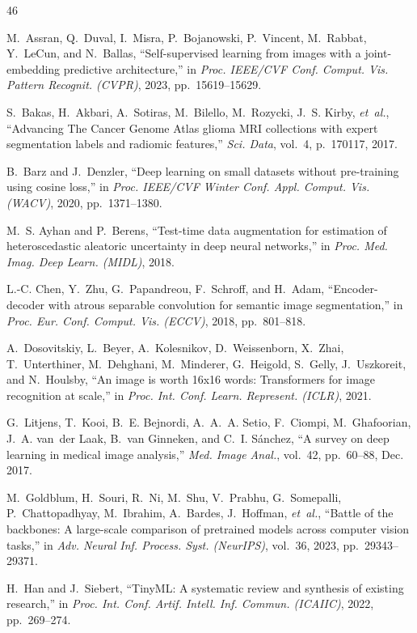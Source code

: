\begin{thebibliography}{46}

M.~Assran, Q.~Duval, I.~Misra, P.~Bojanowski, P.~Vincent, M.~Rabbat, Y.~LeCun, and N.~Ballas, ``Self-supervised learning from images with a joint-embedding predictive architecture,'' in \emph{Proc. IEEE/CVF Conf. Comput. Vis. Pattern Recognit. (CVPR)}, 2023, pp.~15619--15629.

S.~Bakas, H.~Akbari, A.~Sotiras, M.~Bilello, M.~Rozycki, J.~S. Kirby, \emph{et~al.}, ``Advancing The Cancer Genome Atlas glioma MRI collections with expert segmentation labels and radiomic features,'' \emph{Sci. Data}, vol.~4, p.~170117, 2017. 

B.~Barz and J.~Denzler, ``Deep learning on small datasets without pre-training using cosine loss,'' in \emph{Proc. IEEE/CVF Winter Conf. Appl. Comput. Vis. (WACV)}, 2020, pp.~1371--1380.

M.~S. Ayhan and P.~Berens, ``Test-time data augmentation for estimation of heteroscedastic aleatoric uncertainty in deep neural networks,'' in \emph{Proc. Med. Imag. Deep Learn. (MIDL)}, 2018.

L.-C. Chen, Y.~Zhu, G.~Papandreou, F.~Schroff, and H.~Adam, ``Encoder-decoder with atrous separable convolution for semantic image segmentation,'' in \emph{Proc. Eur. Conf. Comput. Vis. (ECCV)}, 2018, pp.~801--818.

A.~Dosovitskiy, L.~Beyer, A.~Kolesnikov, D.~Weissenborn, X.~Zhai, T.~Unterthiner, M.~Dehghani, M.~Minderer, G.~Heigold, S.~Gelly, J.~Uszkoreit, and N.~Houlsby, ``An image is worth 16x16 words: Transformers for image recognition at scale,'' in \emph{Proc. Int. Conf. Learn. Represent. (ICLR)}, 2021.

G.~Litjens, T.~Kooi, B.~E. Bejnordi, A.~A.~A. Setio, F.~Ciompi, M.~Ghafoorian, J.~A. van~der Laak, B.~van Ginneken, and C.~I. S{\'a}nchez, ``A survey on deep learning in medical image analysis,'' \emph{Med. Image Anal.}, vol.~42, pp.~60--88, Dec. 2017. 

M.~Goldblum, H.~Souri, R.~Ni, M.~Shu, V.~Prabhu, G.~Somepalli, P.~Chattopadhyay, M.~Ibrahim, A.~Bardes, J.~Hoffman, \emph{et~al.}, ``Battle of the backbones: A large-scale comparison of pretrained models across computer vision tasks,'' in \emph{Adv. Neural Inf. Process. Syst. (NeurIPS)}, vol.~36, 2023, pp.~29343--29371.

H.~Han and J.~Siebert, ``TinyML: A systematic review and synthesis of existing research,'' in \emph{Proc. Int. Conf. Artif. Intell. Inf. Commun. (ICAIIC)}, 2022, pp.~269--274. 


\end{thebibliography}
